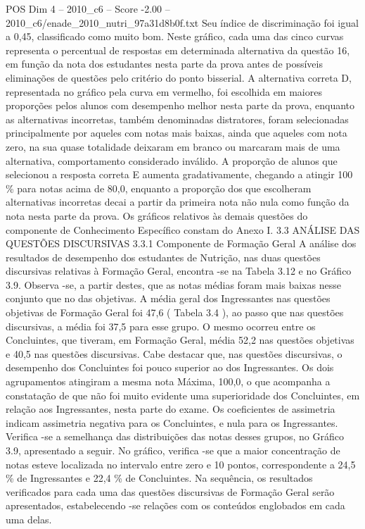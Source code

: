 \begin{textsample}{POS Dim 4 – 2010\_c6 – Score -2.00 – 2010\_c6/enade\_2010\_nutri\_97a31d8b0f.txt}
Seu índice de discriminação foi igual a 0,45, classificado como muito bom.
Neste gráfico, cada uma das cinco curvas representa o percentual de respostas em determinada alternativa da questão 16, em função da nota dos estudantes nesta parte da prova antes de possíveis eliminações de questões pelo critério do ponto bisserial.
A alternativa correta D, representada no gráfico pela curva em vermelho, foi escolhida em maiores proporções pelos alunos com desempenho melhor nesta parte da prova, enquanto as alternativas incorretas, também denominadas distratores, foram selecionadas principalmente por aqueles com notas mais baixas, ainda que aqueles com nota zero, na sua quase totalidade deixaram em branco ou marcaram mais de uma alternativa, comportamento considerado inválido.
A proporção de alunos que selecionou a resposta correta E aumenta gradativamente, chegando a atingir 100 \% para notas acima de 80,0, enquanto a proporção dos que escolheram alternativas incorretas decai a partir da primeira nota não nula como função da nota nesta parte da prova.
Os gráficos relativos às demais questões do componente de Conhecimento Específico constam do Anexo I. 3.3 ANÁLISE DAS QUESTÕES DISCURSIVAS 3.3.1 Componente de Formação Geral A análise dos resultados de desempenho dos estudantes de Nutrição, nas duas questões discursivas relativas à Formação Geral, encontra -se na Tabela 3.12 e no Gráfico 3.9.
Observa -se, a partir destes, que as notas médias foram mais baixas nesse conjunto que no das objetivas.
A média geral dos Ingressantes nas questões objetivas de Formação Geral foi 47,6 ( Tabela 3.4 ), ao passo que nas questões discursivas, a média foi 37,5 para esse grupo.
O mesmo ocorreu entre os Concluintes, que tiveram, em Formação Geral, média 52,2 nas questões objetivas e 40,5 nas questões discursivas.
Cabe destacar que, nas questões discursivas, o desempenho dos Concluintes foi pouco superior ao dos Ingressantes.
Os dois agrupamentos atingiram a mesma nota Máxima, 100,0, o que acompanha a constatação de que não foi muito evidente uma superioridade dos Concluintes, em relação aos Ingressantes, nesta parte do exame.
Os coeficientes de assimetria indicam assimetria negativa para os Concluintes, e nula para os Ingressantes.
Verifica -se a semelhança das distribuições das notas desses grupos, no Gráfico 3.9, apresentado a seguir.
No gráfico, verifica -se que a maior concentração de notas esteve localizada no intervalo entre zero e 10 pontos, correspondente a 24,5 \% de Ingressantes e 22,4 \% de Concluintes.
Na sequência, os resultados verificados para cada uma das questões discursivas de Formação Geral serão apresentados, estabelecendo -se relações com os conteúdos englobados em cada uma delas.

\end{textsample}
